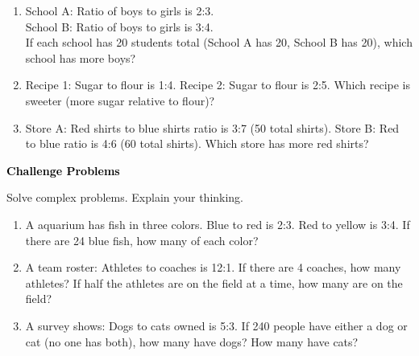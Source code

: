 \documentclass[12pt, letterpaper, fleqn]{article}
\begin{document}
\begin{enumerate}[itemsep=2.2cm, leftmargin=0.6cm]

\item School A: Ratio of boys to girls is 2:3.\\
School B: Ratio of boys to girls is 3:4.\\
If each school has 20 students total (School A has 20, School B has 20), which school has more boys?

\vspace{2cm}

\item Recipe 1: Sugar to flour is 1:4. Recipe 2: Sugar to flour is 2:5. Which recipe is sweeter (more sugar relative to flour)?

\vspace{2cm}

\item Store A: Red shirts to blue shirts ratio is 3:7 (50 total shirts). Store B: Red to blue ratio is 4:6 (60 total shirts). Which store has more red shirts?

\vspace{2cm}

\end{enumerate}

\newpage

\begin{tcolorbox}[colback=customteal!20]
\large\textcolor{black}{\textbf{Challenge Problems}}
\end{tcolorbox}

\noindent
Solve complex problems. Explain your thinking.

\vspace{3mm}

\begin{enumerate}[itemsep=2.3cm, leftmargin=0.6cm]

\item A aquarium has fish in three colors. Blue to red is 2:3. Red to yellow is 3:4. If there are 24 blue fish, how many of each color?

\vspace{2.5cm}

\item A team roster: Athletes to coaches is 12:1. If there are 4 coaches, how many athletes? If half the athletes are on the field at a time, how many are on the field?

\vspace{2.5cm}

\item A survey shows: Dogs to cats owned is 5:3. If 240 people have either a dog or cat (no one has both), how many have dogs? How many have cats?

\vspace{2.5cm}

\end{enumerate}
\end{document}
